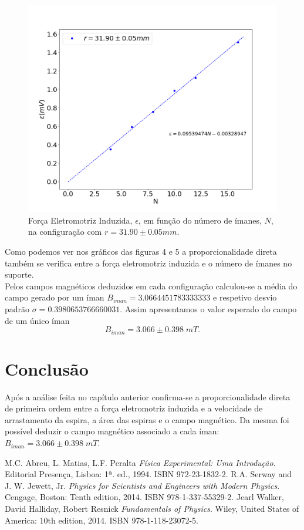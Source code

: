 \documentclass[11pt]{report}
\begin{document}
\begin{figure}
	\center
	\includegraphics[scale=0.35]{bporimanesrconstante.png}
	\caption{Força Eletromotriz Induzida, $\epsilon$, em função do número de ímanes, $N$, na configuração com $r=31.90\pm0.05mm$.}
	\label{}
\end{figure}
Como podemos ver nos gráficos das figuras 4 e 5 a proporcionalidade direta também se verifica entre a força eletromotriz induzida e o número de ímanes no suporte.\\
Pelos campos magnéticos deduzidos em cada configuração calculou-se a média do campo gerado por um íman $B_{iman}=3.0664451783333333$ e respetivo desvio padrão $\sigma=0.3980653766660031$. Assim apresentamos o valor esperado do campo de um único íman $$B_{iman}=3.066 \pm 0.398 \;mT.$$
\chapter{Conclusão}
Após a análise feita no capítulo anterior confirma-se a proporcionalidade direta de primeira ordem entre a força eletromotriz induzida e a velocidade de arrastamento da espira, a área das espiras e o campo magnético.
Da mesma foi possível deduzir o campo magnético associado a cada íman: $B_{iman}=3.066 \pm 0.398 \;mT.$
\begin{thebibliography}{1}

   M.C. Abreu, L. Matias, L.F. Peralta {\it Física Experimental: Uma Introdução}. Editorial Presença, Lisboa: 1ª. ed., 1994. ISBN 972-23-1832-2.
   R.A. Serway and J. W. Jewett, Jr. {\it Physics for Scientists and Engineers with Modern Physics}. Cengage, Boston: Tenth edition, 2014. ISBN 978-1-337-55329-2.
   Jearl Walker, David Halliday, Robert Resnick {\it Fundamentals of Physics}. Wiley, United States of America: 10th edition, 2014. ISBN 978-1-118-23072-5.


\end{thebibliography}
\end{document}
